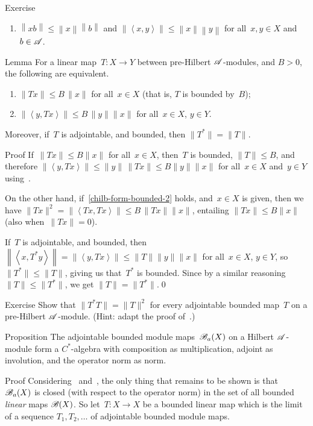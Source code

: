 \documentclass[a]{subfiles}
\begin{document}
\begin{parsec}
\begin{point}{Exercise}
\begin{enumerate}
\item
$\left\|xb\right\|\leq \left\|x\right\|\left\|b\right\|$
and $\left\|\left<x,y\right>\right\|\leq \left\|x\right\|
\left\|y\right\|$
for all~$x,y\in X$ and $b\in \mathscr{A}$.
\end{enumerate}
\end{point}
\begin{point}{Lemma}%
For a linear map~$T\colon X\to Y$
between pre-Hilbert $\mathscr{A}$-modules,
and $B>0$,
the following are equivalent.
\begin{enumerate}
\item 
\label{chilb-form-bounded-1}
$\|Tx\|\leq B\,\|x\|$ for all~$x\in X$
(that is, $T$ is bounded by~$B$);
\item
\label{chilb-form-bounded-2}
$\left\|\left<y,Tx\right>\right\|\leq B\,\|y\|\|x\|$
for all~$x\in X$, $y\in Y$.
\end{enumerate}
Moreover,
if~$T$ is adjointable,
and bounded, then $\|T^*\|=\|T\|$.
\begin{point}{Proof}%
If~$\|Tx\|\leq B\|x\|$ for all~$x\in X$,
then~$T$ is bounded, $\|T\|\leq B$, and therefore
$\left\|\left<y,Tx\right>\right\|
\leq \|y\|\,\|Tx\|\leq B \|y\|\|x\|$
for all~$x\in X$ and~$y\in Y$ using~.

On the other hand,
if~\ref{chilb-form-bounded-2} holds,
and~$x\in X$ is given,
then we have $\|Tx\|^2=\left\|\left<Tx,Tx\right>\right\|
\leq B \,\|Tx\|\|x\|$,
entailing $\|Tx\|\leq B\|x\|$
(also when~$\|Tx\|=0$).

If~$T$ is adjointable, and bounded,
then~$\left\|\left<x,T^*y\right>\right\|=\left\|\left<y,Tx\right>\right\|
\leq \|T\|\|y\|\|x\|$ for all~$x\in X$, $y\in Y$,
so~$\|T^*\|\leq \|T\|$,
giving us that~$T^*$ is bounded.
Since by a similar reasoning $\|T\|\leq \|T^*\|$,
we get $\|T\|=\|T^*\|$.\qed
\end{point}
\end{point}
\begin{point}{Exercise}%
Show that $\|T^*T\|=\|T\|^2$
for every adjointable bounded map~$T$ on a pre-Hilbert $\mathscr{A}$-module.
(Hint: adapt the proof of~.)
\end{point}
\begin{point}{Proposition}%
The adjointable bounded module maps~$\mathscr{B}_a(X)$
on a Hilbert $\mathscr{A}$-module
form a $C^*$-algebra
with composition as multiplication,
adjoint as involution,
and the operator norm as norm.
\begin{point}{Proof}%
Considering~
and~,
the only thing that remains to be shown is that~$\mathscr{B}_a(X)$
is closed (with respect to the operator norm)
in the set of all bounded \emph{linear} maps $\mathscr{B}(X)$.
So let~$T\colon X\to X$ be a bounded linear map
which is the limit of a sequence $T_1,T_2,\dotsc$
of adjointable bounded module maps.


\end{point}
\end{point}
\end{parsec}
\end{document}
